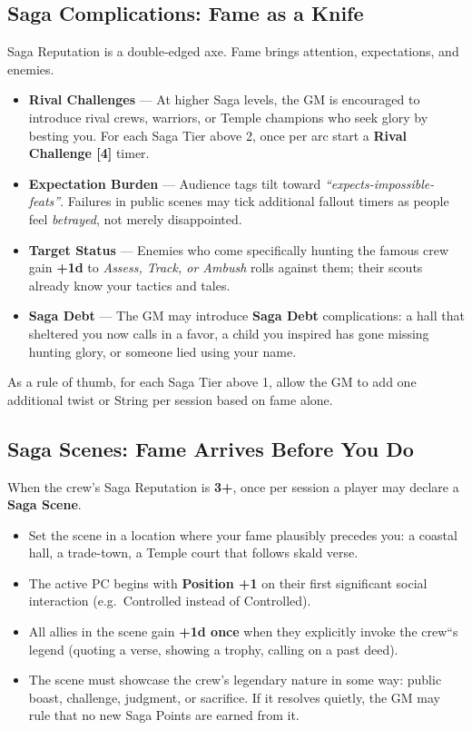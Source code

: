 \documentclass[11pt]{article}
\begin{document}
\subsection{Saga Complications: Fame as a Knife}

Saga Reputation is a double-edged axe. Fame brings attention, expectations, and enemies.

\begin{itemize}
  \item \textbf{Rival Challenges} --- At higher Saga levels, the GM is encouraged to introduce
        rival crews, warriors, or Temple champions who seek glory by besting you. For each Saga
        Tier above 2, once per arc start a \textbf{Rival Challenge [4]} timer.
  \item \textbf{Expectation Burden} --- Audience tags tilt toward
        \emph{``expects-impossible-feats''}. Failures in public scenes may tick additional fallout
        timers as people feel \emph{betrayed}, not merely disappointed.
  \item \textbf{Target Status} --- Enemies who come specifically hunting the famous crew gain
        \textbf{+1d} to \emph{Assess, Track, or Ambush} rolls against them; their scouts already
        know your tactics and tales.
  \item \textbf{Saga Debt} --- The GM may introduce \textbf{Saga Debt} complications: a hall that
        sheltered you now calls in a favor, a child you inspired has gone missing hunting glory,
        or someone lied using your name.
\end{itemize}

As a rule of thumb, for each Saga Tier above 1, allow the GM to add one additional twist or
String per session based on fame alone.

\subsection{Saga Scenes: Fame Arrives Before You Do}

When the crew's Saga Reputation is \textbf{3+}, once per session a player may declare a
\textbf{Saga Scene}.

\begin{itemize}
  \item Set the scene in a location where your fame plausibly precedes you: a coastal hall, a
        trade-town, a Temple court that follows skald verse.
  \item The active PC begins with \textbf{Position +1} on their first significant social
        interaction (e.g.\ Controlled instead of Controlled).
  \item All allies in the scene gain \textbf{+1d once} when they explicitly invoke the crew``s
        legend (quoting a verse, showing a trophy, calling on a past deed).
  \item The scene must showcase the crew's legendary nature in some way: public boast, challenge,
        judgment, or sacrifice. If it resolves quietly, the GM may rule that no new Saga Points
        are earned from it.
\end{itemize}
\end{document}
